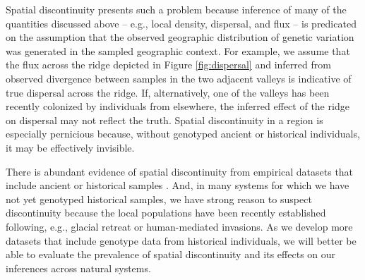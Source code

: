 \documentclass{ar-1col}
\begin{document}
Spatial discontinuity presents such a problem because 
inference of many of the quantities discussed above --  
e.g., local density, dispersal, and flux --
is predicated on the assumption that 
the observed geographic distribution of genetic variation 
was generated in the sampled geographic context.
For example, 
we assume that the flux across the ridge 
depicted in Figure \ref{fig:dispersal}
and inferred from observed divergence 
between samples in the two adjacent valleys 
is indicative of true dispersal across the ridge.
If, alternatively, one of the valleys 
has been recently colonized by individuals from elsewhere, 
the inferred effect of the ridge on dispersal may not reflect the truth.
Spatial discontinuity in a region is especially pernicious because, 
without genotyped ancient or historical individuals, 
it may be effectively invisible.

There is abundant evidence of spatial discontinuity 
from empirical datasets that include ancient or historical samples 
\citep{bi2013unlocking, skoglund2014investigating, PickrellReich2014, lazaridis_ancient_2014, haak2015massive, allentoft2015population, joseph2018inference}.
And, in many systems for which we have not yet genotyped historical samples, 
we have strong reason to suspect discontinuity 
because the local populations have been recently established 
following, e.g., glacial retreat or human-mediated invasions.
As we develop more datasets that include genotype data from historical individuals, 
we will better be able to evaluate the prevalence of spatial discontinuity 
and its effects on our inferences across natural systems. 


\end{document}
